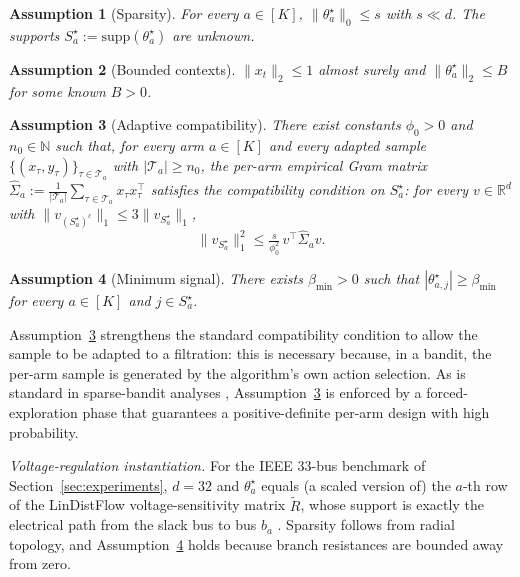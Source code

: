 \documentclass[journal,twoside,web]{ieeecolor}
\newtheorem{assumption}{Assumption}
\begin{document}
\begin{assumption}[Sparsity]\label{ass:sparse}
For every $a \in [K]$, $\|\theta^{\star}_a\|_0 \leq s$ with $s \ll d$. The supports $S^{\star}_a := \mathrm{supp}(\theta^{\star}_a)$ are unknown.
\end{assumption}

\begin{assumption}[Bounded contexts]\label{ass:bounded}
$\|x_t\|_2 \leq 1$ almost surely and $\|\theta^{\star}_a\|_2 \leq B$ for some known $B > 0$.
\end{assumption}

\begin{assumption}[Adaptive compatibility]\label{ass:compat}
There exist constants $\phi_0 > 0$ and $n_0 \in \mathbb{N}$ such that, for every arm $a \in [K]$ and every adapted sample $\{(x_\tau, y_\tau)\}_{\tau \in \mathcal{T}_a}$ with $|\mathcal{T}_a| \geq n_0$, the per-arm empirical Gram matrix $\hat{\Sigma}_a := \tfrac{1}{|\mathcal{T}_a|} \sum_{\tau \in \mathcal{T}_a} x_\tau x_\tau^\top$ satisfies the compatibility condition on $S^{\star}_a$: for every $v \in \mathbb{R}^d$ with $\|v_{(S^{\star}_a)^c}\|_1 \leq 3 \|v_{S^{\star}_a}\|_1$,
\[
\|v_{S^{\star}_a}\|_1^2 \leq \tfrac{s}{\phi_0^2}\, v^\top \hat{\Sigma}_a v.
\]
\end{assumption}

\begin{assumption}[Minimum signal]\label{ass:beta}
There exists $\beta_{\min} > 0$ such that $|\theta^{\star}_{a,j}| \geq \beta_{\min}$ for every $a \in [K]$ and $j \in S^{\star}_a$.
\end{assumption}

Assumption~\ref{ass:compat} strengthens the standard compatibility condition \cite{vandegeer2009conditions} to allow the sample to be adapted to a filtration: this is necessary because, in a bandit, the per-arm sample is generated by the algorithm's own action selection. As is standard in sparse-bandit analyses \cite{bastani2020online,oh2021sparsity}, Assumption~\ref{ass:compat} is enforced by a forced-exploration phase that guarantees a positive-definite per-arm design with high probability.

\textit{Voltage-regulation instantiation.} For the IEEE 33-bus benchmark of Section~\ref{sec:experiments}, $d = 32$ and $\theta^{\star}_a$ equals (a scaled version of) the $a$-th row of the LinDistFlow voltage-sensitivity matrix $\widetilde{R}$, whose support is exactly the electrical path from the slack bus to bus $b_a$ \cite{baran1989network,bolognani2015}. Sparsity follows from radial topology, and Assumption~\ref{ass:beta} holds because branch resistances are bounded away from zero.
\end{document}
